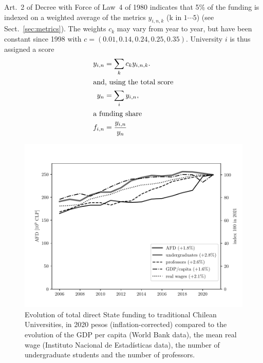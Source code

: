 \documentclass[twocolumn]{article}
\begin{document}
Art.~2 of Decree with Force of Law~4 of 1980 indicates that 5\% of the funding
is indexed on a weighted average of the metrics $y_{i,n,k}$ (k in $1\cdots5$)
(see Sect.~\ref{sec:metrics}). The weights $c_k$ may vary from year to year,
but have been constant since 1998 with $c = (0.01, 0.14, 0.24, 0.25, 0.35)$.  University $i$ is thus assigned a score
\begin{subequations}
\begin{align}
    y_{i,n}    &= \sum_k c_k y_{i,n,k}. \label{eq:y}\\
\intertext{and, using the total score}
    y_{n}      &= \sum_i y_{i,n},\\
\intertext{a funding share}
    f_{i,n}    &= \frac{y_{i,n}}{y_{n}} \label{eq:f}
\end{align}
\end{subequations}


\begin{figure}[t]
\centering
\includegraphics[width=\linewidth]{pdf/total-afd-timeseries.pdf}
\caption{Evolution of total direct State funding to traditional Chilean Universities, in 2020 pesos (inflation-corrected) compared to the evolution of the GDP per capita (World Bank data), the mean real wage (Instituto Nacional de Estadísticas data), the number of undergraduate students and the number of professors.}
\label{fig:total-afd}
\end{figure}
\end{document}
